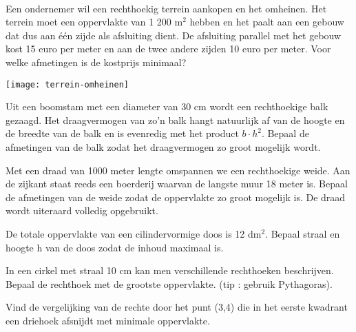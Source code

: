 \documentclass[a4paper,12pt,twoside]{article}
\begin{document}
\begin{oefening}\\
  \begin{minipage}{0.6\textwidth}
    Een ondernemer wil een rechthoekig terrein aankopen en het omheinen. Het terrein moet een oppervlakte van 1 200 m$^2$ hebben en het paalt aan een gebouw dat dus aan één zijde als afsluiting dient. De afsluiting parallel met het gebouw kost 15 euro per meter en aan de twee andere zijden 10 euro per meter. Voor welke afmetingen is de kostprijs minimaal?
  \end{minipage}
  \begin{minipage}{0.4\textwidth}
    \centering
    \texttt{[image: terrein-omheinen]}
  \end{minipage}
\end{oefening}

\begin{oefening}
  Uit een boomstam met een diameter van 30 cm wordt een rechthoekige balk gezaagd. Het draagvermogen van zo'n balk hangt natuurlijk af van de hoogte en de breedte van de balk en is evenredig met het product $b\cdot h^2$. Bepaal de afmetingen van de balk zodat het draagvermogen zo groot mogelijk wordt.
\end{oefening}

\begin{oefening}
  Met een draad van 1000 meter lengte omspannen we een rechthoekige weide. Aan de zijkant staat reeds een boerderij waarvan de langste muur 18 meter is. Bepaal de afmetingen van de weide zodat de oppervlakte zo groot mogelijk is. De draad wordt uiteraard volledig opgebruikt.
\end{oefening}

\begin{oefening}
  De totale oppervlakte van een cilindervormige doos is 12 dm$^2$. Bepaal straal en hoogte h van de doos zodat de inhoud maximaal is.
\end{oefening}

\begin{oefening}
  In een cirkel met straal 10 cm kan men verschillende rechthoeken beschrijven. Bepaal de rechthoek met de grootste oppervlakte. (tip : gebruik Pythagoras).
\end{oefening}

\begin{oefening}
  Vind de vergelijking van de rechte door het punt (3,4) die in het eerste kwadrant een
  driehoek afsnijdt met minimale oppervlakte.
\end{oefening}
\end{document}
